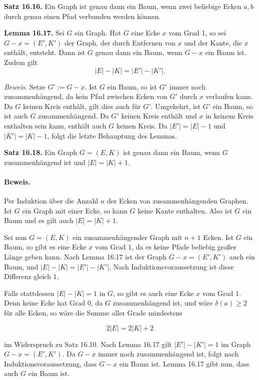 \documentclass[9pt]{article}
\begin{document}
\textbf{Satz 16.16.}  
Ein Graph ist genau dann ein Baum, wenn zwei beliebige Ecken \( a, b \) durch genau einen Pfad verbunden werden können.

\textbf{Lemma 16.17.}  
Sei \( G \) ein Graph. Hat \( G \) eine Ecke \( x \) vom Grad 1, so sei \( G - x = (E', K') \) der Graph, der durch Entfernen von \( x \) und der Kante, die \( x \) enthält, entsteht.  
Dann ist \( G \) genau dann ein Baum, wenn \( G - x \) ein Baum ist. Zudem gilt  
\[
|E| - |K| = |E'| - |K'|.
\]

\textit{Beweis.}  
Setze \( G' := G - x \). Ist \( G \) ein Baum, so ist \( G' \) immer noch zusammenhängend, da kein Pfad zwischen Ecken von \( G' \) durch \( x \) verlaufen kann.  
Da \( G \) keinen Kreis enthält, gilt dies auch für \( G' \).  
Umgekehrt, ist \( G' \) ein Baum, so ist auch \( G \) zusammenhängend. Da \( G' \) keinen Kreis enthält und \( x \) in keinem Kreis enthalten sein kann, enthält auch \( G \) keinen Kreis.  
Da \( |E'| = |E| - 1 \) und \( |K'| = |K| - 1 \), folgt die letzte Behauptung des Lemmas.

\textbf{Satz 16.18.} Ein Graph \( G = (E, K) \) ist genau dann ein Baum, wenn \( G \) zusammenhängend ist und \( |E| = |K| + 1 \).

\paragraph{Beweis.} Per Induktion über die Anzahl \( n \) der Ecken von zusammenhängenden Graphen. Ist \( G \) ein Graph mit einer Ecke, so kann \( G \) keine Kante enthalten. Also ist \( G \) ein Baum und es gilt auch \( |E| = |K| + 1 \).

Sei nun \( G = (E, K) \) ein zusammenhängender Graph mit \( n + 1 \) Ecken. Ist \( G \) ein Baum, so gibt es eine Ecke \( x \) vom Grad \( 1 \), da es keine Pfade beliebig großer Länge geben kann. Nach Lemma 16.17 ist der Graph \( G - x = (E', K') \) auch ein Baum, und \( |E| - |K| = |E'| - |K'| \). Nach Induktionsvoraussetzung ist diese Differenz gleich \( 1 \).

Falls stattdessen \( |E| - |K| = 1 \) in \( G \), so gibt es auch eine Ecke \( x \) vom Grad \( 1 \). Denn keine Ecke hat Grad \( 0 \), da \( G \) zusammenhängend ist, und wäre \( \delta(a) \geq 2 \) für alle Ecken, so wäre die Summe aller Grade mindestens 

\[
2|E| = 2|K| + 2
\]

im Widerspruch zu Satz 16.10. Nach Lemma 16.17 gilt \( |E'| - |K'| = 1 \) im Graph \( G - x = (E', K') \). Da \( G - x \) immer noch zusammenhängend ist, folgt nach Induktionsvoraussetzung, dass \( G - x \) ein Baum ist. Lemma 16.17 gibt nun, dass auch \( G \) ein Baum ist.
\end{document}
